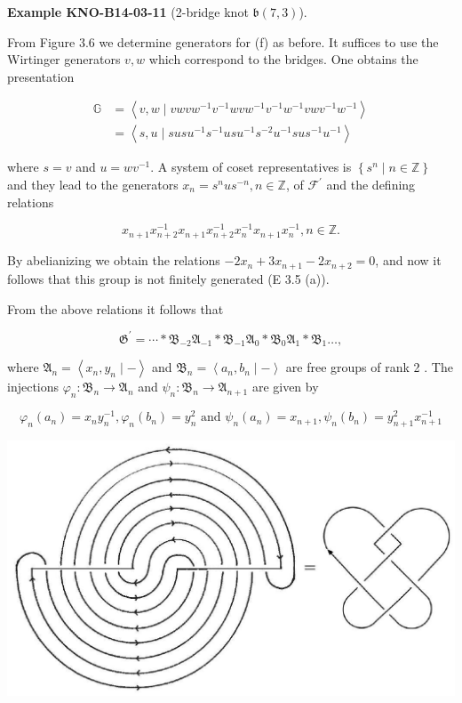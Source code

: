 \documentclass[10pt, letterpaper]{article}
\newcommand{\CustomHeading}[3]{%
  \par\medskip\noindent%
  \textbf{#1 #2} \textnormal{(#3)}.\enskip%
}
\newenvironment{EXA}[2]{\begin{unitbox}\CustomHeading{Example}{#1}{#2}}{\end{unitbox}}
\begin{document}
\begin{EXA}{KNO-B14-03-11}{2-bridge knot $\mathfrak{b}(7,3)$}
From Figure 3.6 we determine generators for (f) as before. It suffices to use the Wirtinger generators $v, w$ which correspond to the bridges. One obtains the presentation

$$
\begin{aligned}
\mathbb{G} & =\left\langle v, w \mid v w v w^{-1} v^{-1} w v w^{-1} v^{-1} w^{-1} v w v^{-1} w^{-1}\right\rangle \\
& =\left\langle s, u \mid s u s u^{-1} s^{-1} u s u^{-1} s^{-2} u^{-1} s u s^{-1} u^{-1}\right\rangle
\end{aligned}
$$

where $s=v$ and $u=w v^{-1}$. A system of coset representatives is $\left\{s^{n} \mid n \in \mathbb{Z}\right\}$ and they lead to the generators $x_{n}=s^{n} u s^{-n}, n \in \mathbb{Z}$, of $\mathscr{F}^{\prime}$ and the defining relations

$$
x_{n+1} x_{n+2}^{-1} x_{n+1} x_{n+2}^{-1} x_{n}^{-1} x_{n+1} x_{n}^{-1}, n \in \mathbb{Z} .
$$

By abelianizing we obtain the relations $-2 x_{n}+3 x_{n+1}-2 x_{n+2}=0$, and now it follows that this group is not finitely generated (E 3.5 (a)).

From the above relations it follows that

$$
\mathfrak{G}^{\prime}=\cdots * \mathfrak{B}_{-2} \mathfrak{A}_{-1} * \mathfrak{B}_{-1} \mathfrak{A}_{0} * \mathfrak{B}_{0} \mathfrak{A}_{1} * \mathfrak{B}_{1} \ldots,
$$

where $\mathfrak{A}_{n}=\left\langle x_{n}, y_{n} \mid-\right\rangle$ and $\mathfrak{B}_{n}=\left\langle a_{n}, b_{n} \mid-\right\rangle$ are free groups of rank 2 . The injections $\varphi_{n}: \mathfrak{B}_{n} \rightarrow \mathfrak{A}_{n}$ and $\psi_{n}: \mathfrak{B}_{n} \rightarrow \mathfrak{A}_{n+1}$ are given by

$$
\varphi_{n}\left(a_{n}\right)=x_{n} y_{n}^{-1}, \varphi_{n}\left(b_{n}\right)=y_{n}^{2} \text { and } \psi_{n}\left(a_{n}\right)=x_{n+1}, \psi_{n}\left(b_{n}\right)=y_{n+1}^{2} x_{n+1}^{-1}
$$

\begin{center}
\includegraphics[scale=0.2]{2025_05_21_9c06be8de7a55410f8c1g-052}
\end{center}


\end{EXA}
\end{document}
